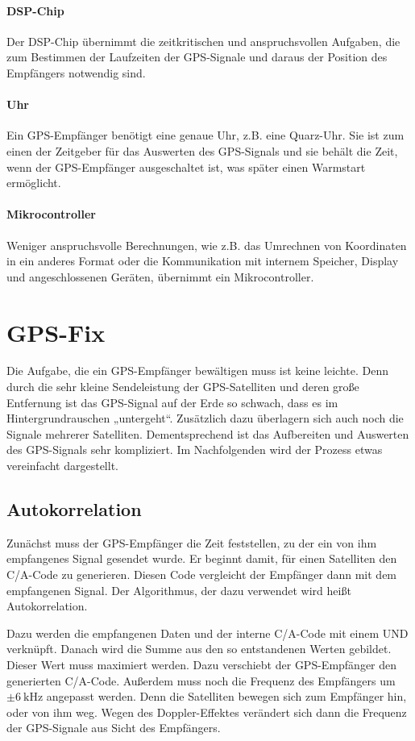 \documentclass[12pt,a4paper]{scrartcl}
\begin{document}
\paragraph{DSP-Chip}
Der DSP-Chip übernimmt die zeitkritischen und anspruchsvollen Aufgaben, die zum Bestimmen der Laufzeiten der GPS-Signale und daraus der Position des Empfängers notwendig sind.

\paragraph{Uhr}
Ein GPS-Empfänger benötigt eine genaue Uhr, z.B. eine Quarz-Uhr. Sie ist zum einen der Zeitgeber für das Auswerten des GPS-Signals und sie behält die Zeit, wenn der GPS-Empfänger ausgeschaltet ist, was später einen Warmstart ermöglicht.

\paragraph{Mikrocontroller}
Weniger anspruchsvolle Berechnungen, wie z.B. das Umrechnen von Koordinaten in ein anderes Format oder die Kommunikation mit internem Speicher, Display und angeschlossenen Geräten, übernimmt ein Mikrocontroller.

\section{GPS-Fix}
Die Aufgabe, die ein GPS-Empfänger bewältigen muss ist keine leichte.
Denn durch die sehr kleine Sendeleistung der GPS-Satelliten und deren große Entfernung ist das GPS-Signal auf der Erde so schwach, dass es im Hintergrundrauschen „untergeht“. Zusätzlich dazu überlagern sich auch noch die Signale mehrerer Satelliten. Dementsprechend ist das Aufbereiten und Auswerten des GPS-Signals sehr kompliziert. Im Nachfolgenden wird der Prozess etwas vereinfacht dargestellt.

\subsection{Autokorrelation}
\label{sec:correlation}
Zunächst muss der GPS-Empfänger die Zeit feststellen, zu der ein von ihm empfangenes Signal gesendet wurde. Er beginnt damit, für einen Satelliten den C/A-Code zu generieren. Diesen Code vergleicht der Empfänger dann mit dem empfangenen Signal. Der Algorithmus, der dazu verwendet wird heißt Autokorrelation.

Dazu werden die empfangenen Daten und der interne C/A-Code mit einem UND verknüpft. Danach wird die Summe aus den so entstandenen Werten gebildet. Dieser Wert muss maximiert werden. Dazu verschiebt der GPS-Empfänger den generierten C/A-Code. Außerdem muss noch die Frequenz des Empfängers um $\pm \SI{6}{\kilo\hertz}$ angepasst werden. Denn die Satelliten bewegen sich zum Empfänger hin, oder von ihm weg. Wegen des Doppler-Effektes verändert sich dann die Frequenz der GPS-Signale aus Sicht des Empfängers.
\end{document}
